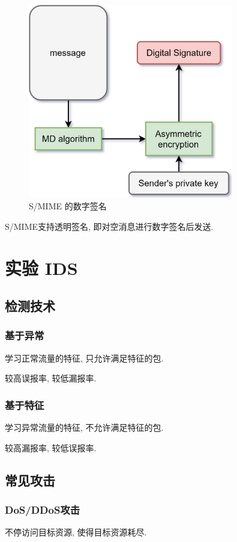 \documentclass{ctexart}
\begin{document}
    \begin{figure}[ht!]
    \centering
    \includegraphics[width=0.8\textwidth]{s-mime-ds.jpg}
    \caption{S/MIME 的数字签名}
    \label{s-mime-ds}
    \end{figure}
    
    S/MIME支持透明签名, 即对空消息进行数字签名后发送.

\pagebreak \appendix

\section{实验 IDS}
\subsection{检测技术}
\subsubsection{基于异常}
    学习正常流量的特征, 只允许满足特征的包.\par
    较高误报率, 较低漏报率.
\subsubsection{基于特征}
    学习异常流量的特征, 不允许满足特征的包.\par
    较高漏报率, 较低误报率.
\subsection{常见攻击}
\subsubsection{DoS/DDoS攻击}
    不停访问目标资源, 使得目标资源耗尽.
\end{document}
